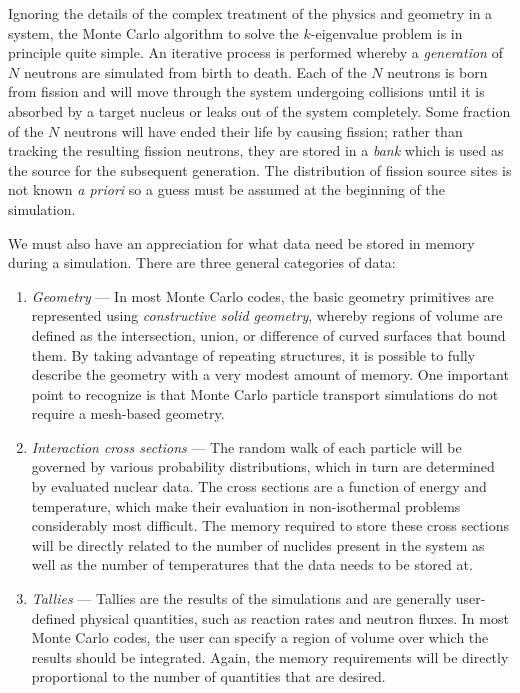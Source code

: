 \documentclass[3p,fleqn]{elsarticle}
\begin{document}
Ignoring the details of the complex treatment of the physics and geometry in a
system, the Monte Carlo algorithm to solve the $k$-eigenvalue problem is in
principle quite simple. An iterative process is performed whereby a
\textit{generation} of $N$ neutrons are simulated from birth to death. Each of
the $N$ neutrons is born from fission and will move through the system
undergoing collisions until it is absorbed by a target nucleus or leaks out of
the system completely. Some fraction of the $N$ neutrons will have ended their
life by causing fission; rather than tracking the resulting fission neutrons,
they are stored in a \textit{bank} which is used as the source for the
subsequent generation. The distribution of fission source sites is not known
\textit{a priori} so a guess must be assumed at the beginning of the simulation.

We must also have an appreciation for what data need be stored in memory during
a simulation. There are three general categories of data:
\begin{enumerate}
  \item \textit{Geometry} --- In most Monte Carlo codes, the basic geometry
    primitives are represented using \textit{constructive solid geometry},
    whereby regions of volume are defined as the intersection, union, or
    difference of curved surfaces that bound them. By taking advantage of
    repeating structures, it is possible to fully describe the geometry with a
    very modest amount of memory. One important point to recognize is that Monte
    Carlo particle transport simulations do not require a mesh-based geometry.
  \item \textit{Interaction cross sections} --- The random walk of each particle
    will be governed by various probability distributions, which in turn are
    determined by evaluated nuclear data. The cross sections are a function of
    energy and temperature, which make their evaluation in non-isothermal
    problems considerably most difficult. The memory required to store these
    cross sections will be directly related to the number of nuclides present in
    the system as well as the number of temperatures that the data needs to be
    stored at.
  \item \textit{Tallies} --- Tallies are the results of the simulations and are
    generally user-defined physical quantities, such as reaction rates and
    neutron fluxes. In most Monte Carlo codes, the user can specify a region of
    volume over which the results should be integrated. Again, the memory
    requirements will be directly proportional to the number of quantities that
    are desired.
\end{enumerate}
\end{document}
